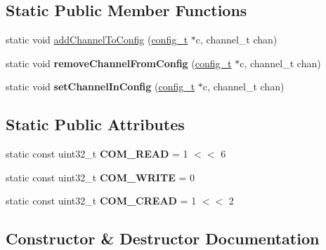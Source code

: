 \subsection*{Static Public Member Functions}
\begin{DoxyCompactItemize}
\item 
static void \hyperlink{classAD7193_acec57d6a685cf7268905efa52c8d40ed}{add\+Channel\+To\+Config} (\hyperlink{structAD7193_1_1config__t}{config\+\_\+t} $\ast$c, channel\+\_\+t chan)
\item 
\mbox{\label{classAD7193_a4956f934c4a7d4d7fc19758edf1da668}} 
static void {\bfseries remove\+Channel\+From\+Config} (\hyperlink{structAD7193_1_1config__t}{config\+\_\+t} $\ast$c, channel\+\_\+t chan)
\item 
\mbox{\label{classAD7193_ab3809187f5142808a1ff265f40b4939e}} 
static void {\bfseries set\+Channel\+In\+Config} (\hyperlink{structAD7193_1_1config__t}{config\+\_\+t} $\ast$c, channel\+\_\+t chan)
\end{DoxyCompactItemize}
\subsection*{Static Public Attributes}
\begin{DoxyCompactItemize}
\item 
\mbox{\label{classAD7193_a5fb463c8a969edfc08789d363af1c0e5}} 
static const uint32\+\_\+t {\bfseries C\+O\+M\+\_\+\+R\+E\+AD} = 1 $<$$<$ 6
\item 
\mbox{\label{classAD7193_ac8b2716c87830f1c53e790692f027151}} 
static const uint32\+\_\+t {\bfseries C\+O\+M\+\_\+\+W\+R\+I\+TE} = 0
\item 
\mbox{\label{classAD7193_a052d4354bfa693785c1d6ef831fabc87}} 
static const uint32\+\_\+t {\bfseries C\+O\+M\+\_\+\+C\+R\+E\+AD} = 1 $<$$<$ 2
\end{DoxyCompactItemize}


\subsection{Constructor \& Destructor Documentation}
\mbox{\label{classAD7193_a68e2fdae94a38bcd69e18c8eb0b9a95b}} 
